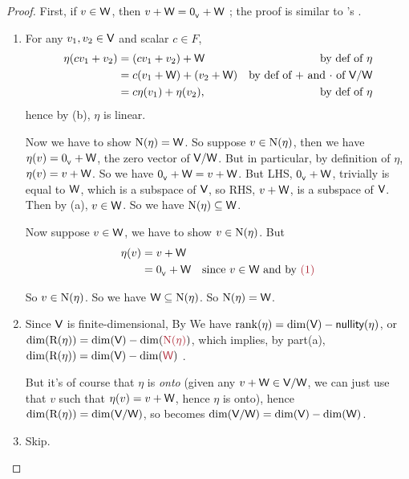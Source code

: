 \begin{proof}
First, if \(v \in \textsf{W}\), then \(v + \textsf{W} = 0_{_{\textsf{V}}} + \textsf{W}\) ;
the proof is similar to 's \RED{(*)}.
\begin{enumerate}
\item For any \(v_1, v_2 \in \textsf{V}\) and scalar \(c \in F\),
\begin{align*}
    \eta(c v_1 + v_2) & = (c v_1 + v_2) + \textsf{W} & \text{by def of \(\eta\)} \\
                      & = c(v_1 + \textsf{W}) + (v_2 + \textsf{W}) & \text{by def of \(+\) and \(\cdot\) of \(\textsf{V}/\textsf{W}\)} \\
                      & = c\eta(v_1) + \eta(v_2), & \text{by def of \(\eta\)}
\end{align*}
hence by (b), \(\eta\) is linear.

Now we have to show \(\mathrm{N}(\eta) = \textsf{W}\).
So suppose \(v \in \mathrm{N}(\eta)\), then we have \(\eta(v) = 0_{_{\textsf{V}}} + \textsf{W}\), the zero vector of \(\textsf{V}/\textsf{W}\).
But in particular, by definition of \(\eta\), \(\eta(v) = v + \textsf{W}\).
So we have \(0_{_{\textsf{V}}} + \textsf{W} = v + \textsf{W}\).
But LHS, \(0_{_{\textsf{V}}} + \textsf{W}\), trivially is equal to \(\textsf{W}\), which is a subspace of \(\textsf{V}\), so RHS, \(v + \textsf{W}\), is a subspace of \(\textsf{V}\).
Then by (a), \(v \in \textsf{W}\).
So we have \(\mathrm{N}(\eta) \subseteq \textsf{W}\).

Now suppose \(v \in \textsf{W}\), we have to show \(v \in \mathrm{N}(\eta)\).
But
\begin{align*}
    \eta(v) & = v + \W \\
            & = \OV + \W & \text{since \(v \in \W\) and by \MAROON{(1)}}
\end{align*}

So \(v \in \mathrm{N}(\eta)\).
So we have \(\textsf{W} \subseteq \mathrm{N}(\eta)\).
So \(\mathrm{N}(\eta) = \textsf{W}\).

\item
Since \(\textsf{V}\) is finite-dimensional, By  We have \(\mathrm{rank}(\eta) = \dim(\textsf{V}) - \textsf{nullity}(\eta)\), or \(\dim(\RANGE(\eta)) = \dim(\V) - \dim(\MAROON{\NULL(\eta)})\), which implies, by part(a), \(\dim(\RANGE(\eta)) = \dim(\V) - \dim(\MAROON{\W})\) .

But it's of course that \(\eta\) is \emph{onto} (given any \(v + \textsf{W} \in \textsf{V}/\textsf{W}\), we can just use that \(v\) such that \(\eta(v) = v + \textsf{W}\), hence \(\eta\) is onto),
hence \(\dim(\mathrm{R}(\eta)) = \dim(\textsf{V}/\textsf{W})\), so  becomes \(\dim(\textsf{V}/\textsf{W}) = \dim(\textsf{V}) - \dim(\textsf{W})\).

\item Skip.
\end{enumerate}
\end{proof}


